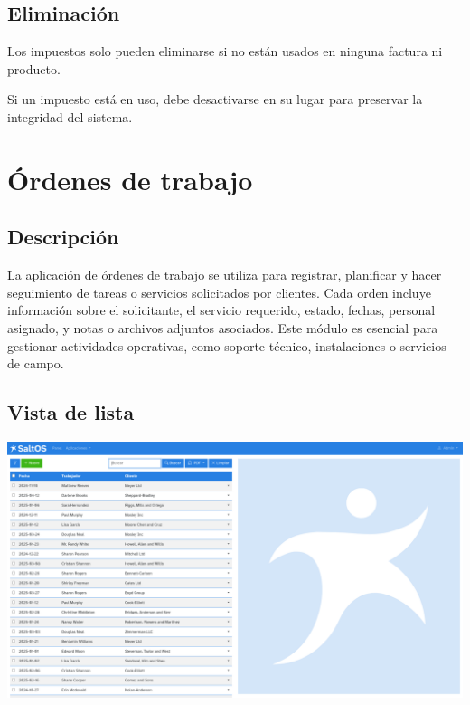 \documentclass[a4paper]{article}
\begin{document}
\hypertarget{toc170}{}
\subsection{Eliminación}

Los impuestos solo pueden eliminarse si no están usados en ninguna factura ni producto.

Si un impuesto está en uso, debe desactivarse en su lugar para preservar la integridad del sistema.


\hypertarget{toc171}{}
\section{Órdenes de trabajo}

\hypertarget{toc172}{}
\subsection{Descripción}

La aplicación de órdenes de trabajo se utiliza para registrar, planificar y hacer seguimiento de tareas o servicios solicitados por clientes.
Cada orden incluye información sobre el solicitante, el servicio requerido, estado, fechas, personal asignado,
y notas o archivos adjuntos asociados. Este módulo es esencial para gestionar actividades operativas,
como soporte técnico, instalaciones o servicios de campo.

\hypertarget{toc173}{}
\subsection{Vista de lista}

\begin{center}\includegraphics[width=1\textwidth]{../ujest/snaps/test-screenshots-js-screenshots-sales-workorders-list-es-es-1-snap.png}\end{center}
\end{document}
